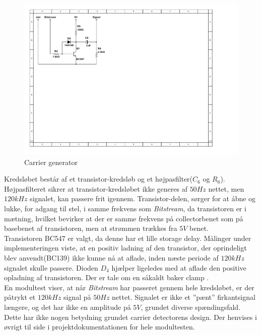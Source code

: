 \begin{figure}[h]
	\centering
	\includegraphics[scale=0.9, trim=45 355 525 45, clip=true]{../Projektdokumentation/HardwareDesign/Diagrammer/CarrierGenerator.pdf}
	\caption{Carrier generator}
	\label{fig:CarrierGen}
\end{figure}

Kredsløbet består af et transistor-kredsløb\cite{lib:BC547} og et højpasfilter($C_{6}$ og $R_{6}$). Højpasfilteret sikrer at transistor-kredsløbet ikke generes af $50Hz$ nettet, men $120kHz$ signalet, kan passere frit igennem. Transistor-delen, sørger for at åbne og lukke, for adgang til stel, i samme frekvens som \textit{Bitstream}, da transistoren er i mætning, hvilket bevirker at der er samme frekvens på collectorbenet som på basebenet af transistoren, men at strømmen trækkes fra $5V$ benet.\\

Transistoren BC547 er valgt, da denne har et lille storage delay. Målinger under implementeringen viste, at en positiv ladning af den transistor, der oprindeligt blev anvendt(BC139) ikke kunne nå at aflade, inden næste periode af $120kHz$ signalet skulle passere. Dioden $D_{4}$ hjælper ligeledes med at aflade den positive opladning af transistoren. Der er tale om en såkaldt baker clamp \cite{lib:BakerClamp}.\\

En modultest viser, at når \textit{Bitstream} har passeret gennem hele kredsløbet, er der påtrykt et $120kHz$ signal på $50Hz$ nettet. Signalet er ikke et ''pænt'' firkantsignal længere, og det har ikke en amplitude på $5V$, grundet diverse spændingsfald. Dette har ikke nogen betydning grundet carrier detectorens design. Der henvises i øvrigt til side \pageref{P-fig:CGImpl1} i projektdokumentationen for hele modultesten.\\

